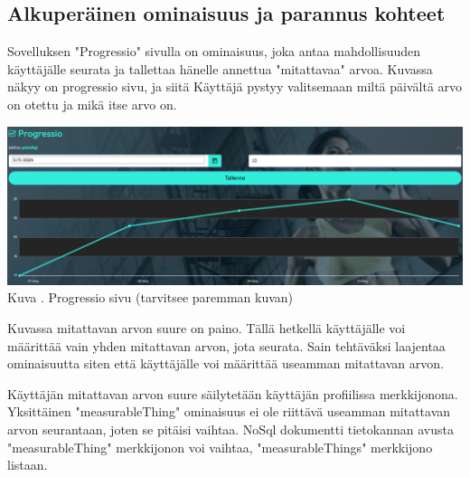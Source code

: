 

\subsection{Alkuperäinen ominaisuus ja parannus kohteet}





Sovelluksen "Progressio"{} sivulla on ominaisuus, 
joka antaa mahdollisuuden käyttäjälle seurata ja tallettaa hänelle annettua "mitattavaa"{} arvoa.
Kuvassa \nextImageCount {} näkyy on progressio sivu, 
ja siitä Käyttäjä pystyy valitsemaan miltä päivältä arvo on otettu ja mikä itse arvo on.
\medskip

\bigskip
\includegraphics[width =15cm]{src/public/progressiosingle.png}\\
Kuva \getImgCount {}. Progressio sivu (tarvitsee paremman kuvan)
\medskip



Kuvassa \theimgCounter {} mitattavan arvon suure on paino. 
% 
Tällä hetkellä käyttäjälle voi määrittää vain yhden mitattavan arvon, jota seurata.
Sain tehtäväksi laajentaa ominaisuutta siten että käyttäjälle voi määrittää useamman mitattavan arvon.
\medskip


Käyttäjän mitattavan arvon suure säilytetään käyttäjän profiilissa merkkijonona. 
Yksittäinen "measurableThing"{} ominaisuus ei ole riittävä useamman mitattavan arvon seurantaan, joten se pitäisi vaihtaa.
%
NoSql dokumentti tietokannan avusta "measurableThing"{} merkkijonon voi vaihtaa, "measurableThings"{} merkkijono listaan.
\medskip






